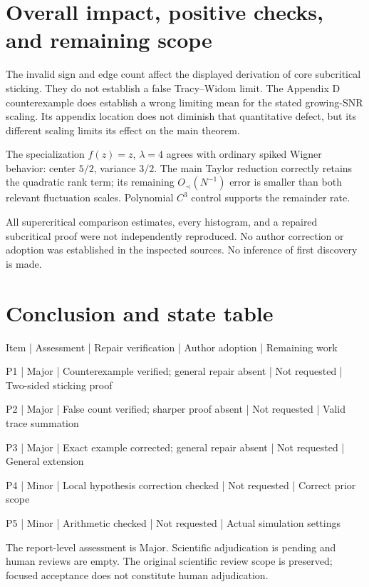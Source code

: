 \documentclass[10pt]{article}
\begin{document}
\section*{Overall impact, positive checks, and remaining scope}
The invalid sign and edge count affect the displayed derivation of core subcritical sticking. They do not establish a false Tracy–Widom limit. The Appendix D counterexample does establish a wrong limiting mean for the stated growing-SNR scaling. Its appendix location does not diminish that quantitative defect, but its different scaling limits its effect on the main theorem.\par
The specialization \(f(z)=z\), \(\lambda=4\) agrees with ordinary spiked Wigner behavior: center \(5/2\), variance \(3/2\). The main Taylor reduction correctly retains the quadratic rank term; its remaining \(O_\prec(N^{-1})\) error is smaller than both relevant fluctuation scales. Polynomial \(C^3\) control supports the remainder rate.\par
All supercritical comparison estimates, every histogram, and a repaired subcritical proof were not independently reproduced. No author correction or adoption was established in the inspected sources. No inference of first discovery is made.\par
\section*{Conclusion and state table}
Item | Assessment | Repair verification | Author adoption | Remaining work\par
P1 | Major | Counterexample verified; general repair absent | Not requested | Two-sided sticking proof\par
P2 | Major | False count verified; sharper proof absent | Not requested | Valid trace summation\par
P3 | Major | Exact example corrected; general repair absent | Not requested | General extension\par
P4 | Minor | Local hypothesis correction checked | Not requested | Correct prior scope\par
P5 | Minor | Arithmetic checked | Not requested | Actual simulation settings\par
The report-level assessment is Major. Scientific adjudication is pending and human reviews are empty. The original scientific review scope is preserved; focused acceptance does not constitute human adjudication.\par
\end{document}
